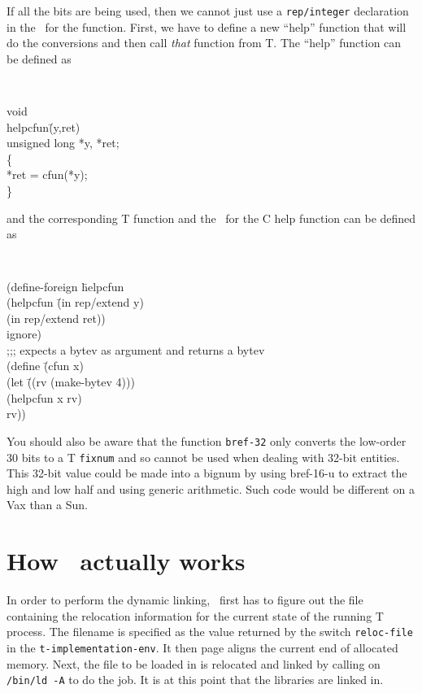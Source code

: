 If all the bits are being used, then we cannot just use a
\verb!rep/integer! declaration in the \df\ for the function.
First, we have to define a new ``help'' function that will do the
conversions and then call {\em that\/} function from T.
The ``help'' function can be defined as

\horizline
{\tt
\begin{tabbing}
void\\
helpcfun\= (y,ret)\\
	\> unsigned long *y, *ret;\\
\{\\
	\> *ret = cfun(*y);\\
\}
\end{tabbing}
}
\horizline

and the corresponding T function and the \df\ for the C help function
can be defined as

\horizline
{\tt
\begin{tabbing}
(define-foreign \= helpcfun\\
	\> (helpcfun \= (in rep/extend y)\\
		\>\> (in rep/extend ret))\\
	\> ignore)\\[2ex]

;;; expects a bytev as argument and returns a bytev\\
(define \= (cfun x)\\
	\> (let \= ((rv (make-bytev 4)))\\
		\>\> (helpcfun x rv)\\
		\>\> rv))
\end{tabbing}
}
\horizline

You should also be aware that the function
{\tt bref-32} only converts the
low-order 30 bits to a T {\tt fixnum} and so cannot be used when
dealing with 32-bit entities.  This 32-bit value could be made into a
bignum by using bref-16-u to extract the high and low half and using
generic arithmetic.  Such code would be different on a Vax than a Sun.

\section{How \lf\ actually works}
\label{sec-lf-esoterica}

In order to perform the dynamic linking, \lf\ first has to figure out
the file containing the relocation information for the current state
of the running T process.
The filename is specified as the value returned by the switch
{\tt reloc-file} in the {\tt t-implementation-env}.
It then page aligns the current end of allocated memory.
Next, the file to be loaded in is relocated and linked by calling on
\verb!/bin/ld -A! to do the job.
It is at this point that the libraries are linked in.

